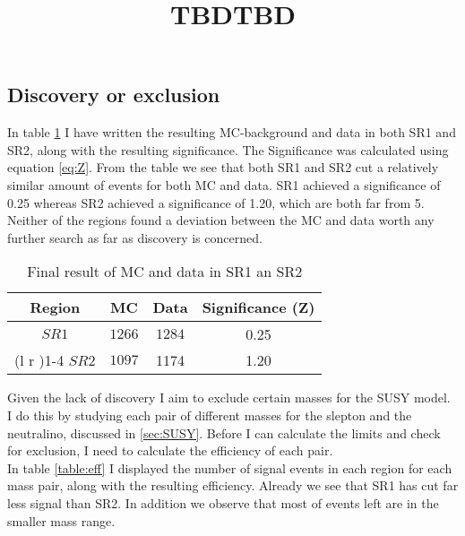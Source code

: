 \documentclass{article}
\begin{document}
\subsection{Discovery or exclusion}
In table \ref{table:SR1_SR2} I have written the resulting MC-background and data in both SR1 and SR2, along with the resulting significance. The Significance was calculated using equation \ref{eq:Z}. From the table we see that both SR1 and SR2 cut a relatively similar amount of events for both MC and data. SR1 achieved a significance of 0.25 whereas SR2 achieved a significance of 1.20, which are both far from 5. Neither of the regions found a deviation between the MC and data worth any further search as far as discovery is concerned.
\\
\bgroup
\title{TBD}
{\tabcolsep=20pt
\begin{table}
    \caption{Final result of MC and data in SR1 an SR2}
    \label{table:SR1_SR2}
    \centering 
    \begin{threeparttable}
    \begin{tabular}{cccc}
    \textbf{Region} & \textbf{MC} & \textbf{Data} & \textbf{Significance (Z)}\\
    \midrule\midrule
    $SR1$   & $1266$ &  $1284$ & 0.25 \\%
    \cmidrule(l  r ){1-4}
    $SR2$ & $1097$ &  1174 & 1.20 \\ 
    \midrule\midrule
    \end{tabular}
    \end{threeparttable}
\end{table}
}
\egroup
Given the lack of discovery I aim to exclude certain masses for the SUSY model. I do this by studying each pair of different masses for the slepton and the neutralino, discussed in \ref{sec:SUSY}. Before I can calculate the limits and check for exclusion, I need to calculate the efficiency of each pair. 
\\
In table \ref{table:eff} I displayed the number of signal events in each region for each mass pair, along with the resulting efficiency. Already we see that SR1 has cut far less signal than SR2. In addition we observe that most of events left are in the smaller mass range. 
\bgroup
\centering
\title{TBD}
\end{document}
